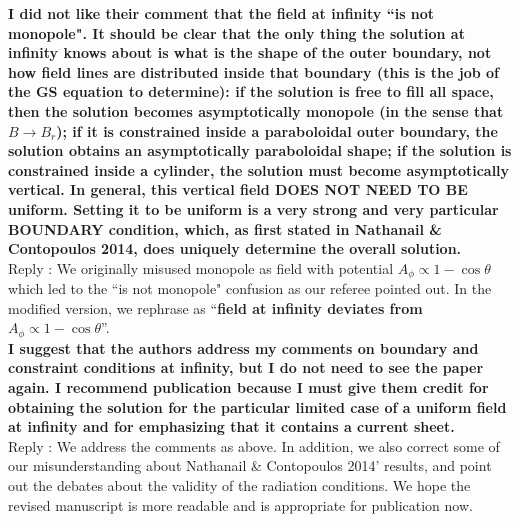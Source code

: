 {\bf I did not like their comment that the field at infinity ``is not monopole".
It should be clear that the only thing the solution at infinity knows about is
what is the shape of the outer boundary, not how field lines are distributed inside that boundary
(this is the job of the GS equation to determine): if the solution is free to fill all space,
then the solution becomes asymptotically monopole (in the sense that $B\rightarrow B_r$);
if it is constrained inside a paraboloidal outer boundary, the solution obtains
an asymptotically paraboloidal shape; if the solution is constrained inside a cylinder,
the solution must become asymptotically vertical. In general, this vertical field DOES NOT NEED TO BE uniform.
Setting it to be uniform is a very strong and very particular BOUNDARY condition, which,
as first stated in Nathanail \& Contopoulos 2014, does uniquely determine the overall solution.}\\

\< Reply : We originally misused monopole as field with potential $A_\phi \propto 1-\cos\theta$
which led to the ``is not monopole" confusion as our referee pointed out.
In the modified version, we rephrase as
 ``{\bf field at infinity deviates from $A_\phi \propto 1-\cos\theta$}''. \\

{\bf I suggest that the authors address my comments on boundary and constraint conditions at infinity,
but I do not need to see the paper again. I recommend publication because
I must give them credit for obtaining the solution for the particular limited case of
a uniform field at infinity and for emphasizing that it contains a current sheet.}\\

\< Reply : We address the comments as above.
In addition, we also correct some of our misunderstanding about Nathanail \& Contopoulos 2014' results,
and point out the debates about the validity of the radiation conditions. We hope the revised
manuscript is more readable and is appropriate for publication now.






